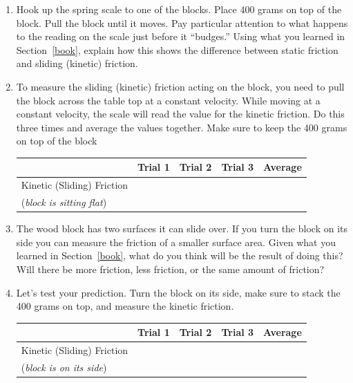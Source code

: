 \documentclass[10pt]{exam}
\begin{document}
\begin{enumerate}
  \item 
    Hook up the spring scale to one of the blocks. Place 400 grams on top of the block.  Pull the block until it moves.  Pay particular attention to what happens to the reading on the scale just before it ``budges.''  Using what you learned in Section~\ref{book}, explain how this shows the difference between static friction and sliding (kinetic) friction.
    \vs
    
  \item
    To measure the sliding (kinetic) friction acting on the block, you need to pull the block across the table top at a constant velocity. While moving at a constant velocity, the scale will read the value for the kinetic friction.  Do this three times and average the values together.  Make sure to keep the 400 grams on top of the block

    \begin{tabular}{|l
      *3{|>{\centering\arraybackslash}m{.1\textwidth}}
      ||>{\centering\arraybackslash}m{.1\textwidth}|}
      \hline
      & Trial 1 & Trial 2 & Trial 3 & Average \\\hline
        Kinetic (Sliding) Friction &&&& \\
        (\emph{block is sitting flat}) &&&& \\\hline
    \end{tabular}


  \item \label{area-predict}
    The wood block has two surfaces it can slide over.  If you turn the block on its side you can measure the friction of a smaller surface area. Given what you learned in Section~\ref{book}, what do you think will be the result of doing this? Will there be more friction, less friction, or the same amount of friction?
    \vs 

  \item 
    Let's test your prediction.  Turn the block on its side, make sure to stack the 400 grams on top, and measure the kinetic friction.

    \begin{tabular}{|l
      *3{|>{\centering\arraybackslash}m{.1\textwidth}}
      ||>{\centering\arraybackslash}m{.1\textwidth}|}
      \hline
      & Trial 1 & Trial 2 & Trial 3 & Average \\\hline
        Kinetic (Sliding) Friction &&&& \\
        (\emph{block is on its side}) &&&& \\\hline
    \end{tabular}


\end{enumerate}
\end{document}
